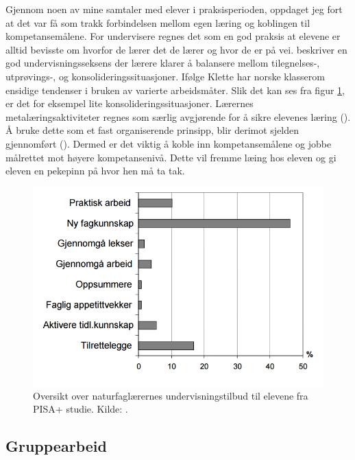 \documentclass[main.tex]{subfiles}
\begin{document}
Gjennom noen av mine samtaler med elever i praksisperioden, oppdaget jeg fort at det var få som trakk forbindelsen mellom egen læring og koblingen til kompetansemålene. For undervisere regnes det som en god praksis at elevene er alltid bevisste om hvorfor de lærer det de lærer og hvor de er på vei.  beskriver en god undervisningsseksens der lærere klarer å balansere mellom tilegnelses-, utprøvings-, og konsolideringssituasjoner. Ifølge Klette har norske klasserom ensidige tendenser i bruken av varierte arbeidsmåter. Slik det kan ses fra figur \ref{fig:odeg10}, er det for eksempel lite konsolideringssituasjoner. Lærernes metalæringsaktiviteter regnes som særlig avgjørende for å sikre elevenes læring (). Å bruke dette som et fast organiserende prinsipp, blir derimot sjelden gjennomført (). Dermed er det viktig å koble inn kompetansemålene og jobbe målrettet mot høyere kompetansenivå. Dette vil fremme læing hos eleven og gi eleven en pekepinn på hvor hen må ta tak.
\begin{figure}[h!]
\includegraphics[scale = 0.6]{../figures/undervisnings_aktivitet.png}
\caption{Oversikt over naturfaglærernes undervisningstilbud til elevene fra PISA+ studie. Kilde: 
\protect{}.}
\label{fig:odeg10}
\end{figure}


\subsection*{Gruppearbeid}
\end{document}
